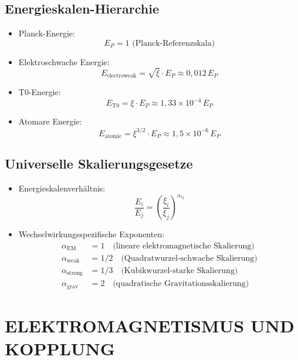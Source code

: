 \documentclass[12pt,a4paper]{article}
\begin{document}
	\subsection{Energieskalen-Hierarchie}
	\begin{itemize}
		\item Planck-Energie:
		$$E_P = 1 \text{ (Planck-Referenzskala)}$$
		
		\item Elektroschwache Energie:
		$$E_{\text{electroweak}} = \sqrt{\xi} \cdot E_P \approx 0,012 \, E_P$$
		
		\item T0-Energie:
		$$E_{\text{T0}} = \xi \cdot E_P \approx 1,33 \times 10^{-4} \, E_P$$
		
		\item Atomare Energie:
		$$E_{\text{atomic}} = \xi^{3/2} \cdot E_P \approx 1,5 \times 10^{-6} \, E_P$$
	\end{itemize}
	
	\subsection{Universelle Skalierungsgesetze}
	\begin{itemize}
		\item Energieskalenverh\"{a}ltnis:
		$$\frac{E_i}{E_j} = \left(\frac{\xi_i}{\xi_j}\right)^{\alpha_{ij}}$$
		
		\item Wechselwirkungsspezifische Exponenten:
		\begin{align*}
			\alpha_{\text{EM}} &= 1 \quad \text{(lineare elektromagnetische Skalierung)}\\
			\alpha_{\text{weak}} &= 1/2 \quad \text{(Quadratwurzel-schwache Skalierung)}\\
			\alpha_{\text{strong}} &= 1/3 \quad \text{(Kubikwurzel-starke Skalierung)}\\
			\alpha_{\text{grav}} &= 2 \quad \text{(quadratische Gravitationsskalierung)}
		\end{align*}
	\end{itemize}
	
	\section{ELEKTROMAGNETISMUS UND KOPPLUNG}
	
\end{document}

